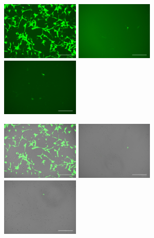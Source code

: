 \documentclass[onecolumn,10pt]{asme2ej}
\begin{document}
\begin{figure}[h]
	\includegraphics[width=0.33\textwidth]{figures/electro/ctrl-elec-g.jpg}
	\includegraphics[width=0.33\textwidth]{figures/electro/G2000(D1).jpg}
	\includegraphics[width=0.33\textwidth]{figures/electro/GMAX(D3).jpg}
	
	\includegraphics[width=0.33\textwidth]{figures/electro/ctrl-elec-m.jpg}
	\includegraphics[width=0.33\textwidth]{figures/electro/Compo2000.jpg}
	\includegraphics[width=0.33\textwidth]{figures/electro/CompoMAX.jpg}
	

\end{figure}
\end{document}
